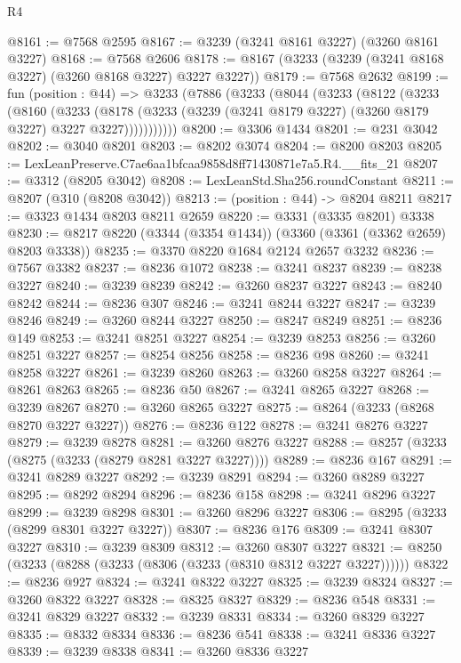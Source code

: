 \begin{lexlean}{R4}
\begin{coremodule}
@8161 := @7568 @2595
@8167 := @3239 (@3241 @8161 @3227) (@3260 @8161 @3227)
@8168 := @7568 @2606
@8178 := @8167 (@3233 (@3239 (@3241 @8168 @3227) (@3260 @8168 @3227) @3227 @3227))
@8179 := @7568 @2632
@8199 := fun (position : @44) =>
  @3233
    (@7886
      (@3233
        (@8044
          (@3233
            (@8122
              (@3233
                (@8160
                  (@3233
                    (@8178
                      (@3233 (@3239 (@3241 @8179 @3227) (@3260 @8179 @3227) @3227 @3227)))))))))))
@8200 := @3306 @1434
@8201 := @231 @3042
@8202 := @3040 @8201
@8203 := @8202 @3074
@8204 := @8200 @8203
@8205 := LexLeanPreserve.C7ae6aa1bfcaa9858d8ff71430871e7a5.R4.__fits_21
@8207 := @3312 (@8205 @3042)
@8208 := LexLeanStd.Sha256.roundConstant
@8211 := @8207 (@310 (@8208 @3042))
@8213 := (position : @44) -> @8204 @8211
@8217 := @3323 @1434 @8203 @8211 @2659
@8220 := @3331 (@3335 @8201) @3338
@8230 := @8217 @8220 (@3344 (@3354 @1434)) (@3360 (@3361 (@3362 @2659) @8203 @3338))
@8235 := @3370 @8220 @1684 @2124 @2657 @3232
@8236 := @7567 @3382
@8237 := @8236 @1072
@8238 := @3241 @8237
@8239 := @8238 @3227
@8240 := @3239 @8239
@8242 := @3260 @8237 @3227
@8243 := @8240 @8242
@8244 := @8236 @307
@8246 := @3241 @8244 @3227
@8247 := @3239 @8246
@8249 := @3260 @8244 @3227
@8250 := @8247 @8249
@8251 := @8236 @149
@8253 := @3241 @8251 @3227
@8254 := @3239 @8253
@8256 := @3260 @8251 @3227
@8257 := @8254 @8256
@8258 := @8236 @98
@8260 := @3241 @8258 @3227
@8261 := @3239 @8260
@8263 := @3260 @8258 @3227
@8264 := @8261 @8263
@8265 := @8236 @50
@8267 := @3241 @8265 @3227
@8268 := @3239 @8267
@8270 := @3260 @8265 @3227
@8275 := @8264 (@3233 (@8268 @8270 @3227 @3227))
@8276 := @8236 @122
@8278 := @3241 @8276 @3227
@8279 := @3239 @8278
@8281 := @3260 @8276 @3227
@8288 := @8257 (@3233 (@8275 (@3233 (@8279 @8281 @3227 @3227))))
@8289 := @8236 @167
@8291 := @3241 @8289 @3227
@8292 := @3239 @8291
@8294 := @3260 @8289 @3227
@8295 := @8292 @8294
@8296 := @8236 @158
@8298 := @3241 @8296 @3227
@8299 := @3239 @8298
@8301 := @3260 @8296 @3227
@8306 := @8295 (@3233 (@8299 @8301 @3227 @3227))
@8307 := @8236 @176
@8309 := @3241 @8307 @3227
@8310 := @3239 @8309
@8312 := @3260 @8307 @3227
@8321 := @8250 (@3233 (@8288 (@3233 (@8306 (@3233 (@8310 @8312 @3227 @3227))))))
@8322 := @8236 @927
@8324 := @3241 @8322 @3227
@8325 := @3239 @8324
@8327 := @3260 @8322 @3227
@8328 := @8325 @8327
@8329 := @8236 @548
@8331 := @3241 @8329 @3227
@8332 := @3239 @8331
@8334 := @3260 @8329 @3227
@8335 := @8332 @8334
@8336 := @8236 @541
@8338 := @3241 @8336 @3227
@8339 := @3239 @8338
@8341 := @3260 @8336 @3227

\end{coremodule}
\end{lexlean}
